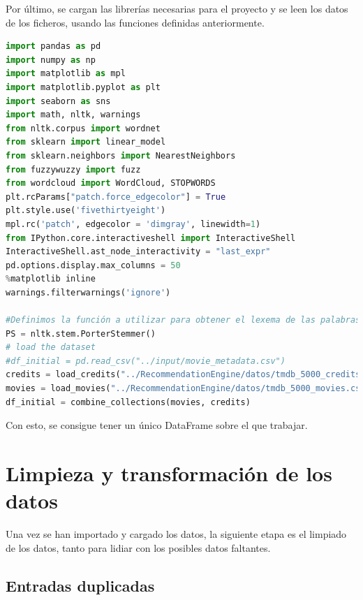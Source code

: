Por último, se cargan las librerías necesarias para el proyecto y se leen los datos de los ficheros, usando las funciones definidas anteriormente.
\begin{lstlisting}[language=Python, caption=Código usado para la carga de los datos.]
import pandas as pd
import numpy as np
import matplotlib as mpl
import matplotlib.pyplot as plt
import seaborn as sns
import math, nltk, warnings
from nltk.corpus import wordnet
from sklearn import linear_model
from sklearn.neighbors import NearestNeighbors
from fuzzywuzzy import fuzz
from wordcloud import WordCloud, STOPWORDS
plt.rcParams["patch.force_edgecolor"] = True
plt.style.use('fivethirtyeight')
mpl.rc('patch', edgecolor = 'dimgray', linewidth=1)
from IPython.core.interactiveshell import InteractiveShell
InteractiveShell.ast_node_interactivity = "last_expr"
pd.options.display.max_columns = 50
%matplotlib inline
warnings.filterwarnings('ignore')

#Definimos la función a utilizar para obtener el lexema de las palabras.
PS = nltk.stem.PorterStemmer()
# load the dataset
#df_initial = pd.read_csv("../input/movie_metadata.csv")
credits = load_credits("../RecommendationEngine/datos/tmdb_5000_credits.csv")
movies = load_movies("../RecommendationEngine/datos/tmdb_5000_movies.csv")
df_initial = combine_collections(movies, credits)
\end{lstlisting}

Con esto, se consigue tener un único DataFrame sobre el que trabajar.

\newpage
\section{Limpieza y transformación de los datos}

Una vez se han importado y cargado los datos, la siguiente etapa es el limpiado de los datos, tanto para lidiar con los posibles datos faltantes.

\subsection{Entradas duplicadas}

